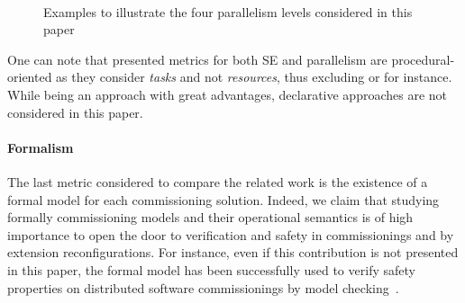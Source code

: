\begin{figure*}[t!]
  \begin{center}
    \\

    \caption{Examples to illustrate the four parallelism levels
      considered in this paper}
    \label{fig:parlevels}
  \end{center}
\end{figure*}

One can note that presented metrics for both SE and parallelism are
procedural-oriented as they consider \emph{tasks} and not
\emph{resources}, thus excluding \puppet or \salt for instance. While
being an approach with great advantages, declarative approaches are
not considered in this paper.

\paragraph{Formalism}
The last metric considered to compare the related work is the
existence of a formal model for each commissioning solution. Indeed,
we claim that studying formally commissioning models and their
operational semantics is of high importance to open the door to
verification and safety in commissionings and by extension
reconfigurations. For instance, even if this contribution is not
presented in this paper, the formal model \mad has been
successfully used to verify safety properties on distributed software
commissionings by model checking~\cite{coullon:hal-02323641}.

